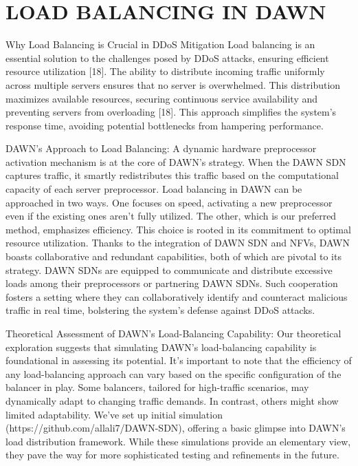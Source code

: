 \documentclass[conference]{IEEEtran}
\begin{document}
\section{LOAD BALANCING IN DAWN}

Why Load Balancing is Crucial in DDoS Mitigation
Load balancing is an essential solution to the challenges posed by DDoS attacks, ensuring efficient resource utilization [18]. The ability to distribute incoming traffic uniformly across multiple servers ensures that no server is overwhelmed. This distribution maximizes available resources, securing continuous service availability and preventing servers from overloading [18]. This approach simplifies the system's response time, avoiding potential bottlenecks from hampering performance. 

DAWN's Approach to Load Balancing: 
A dynamic hardware preprocessor activation mechanism is at the core of DAWN's strategy. When the DAWN SDN captures traffic, it smartly redistributes this traffic based on the computational capacity of each server preprocessor. Load balancing in DAWN can be approached in two ways. One focuses on speed, activating a new preprocessor even if the existing ones aren't fully utilized. The other, which is our preferred method, emphasizes efficiency. This choice is rooted in its commitment to optimal resource utilization.
Thanks to the integration of DAWN SDN and NFVs, DAWN boasts collaborative and redundant capabilities, both of which are pivotal to its strategy. DAWN SDNs are equipped to communicate and distribute excessive loads among their preprocessors or partnering DAWN SDNs. Such cooperation fosters a setting where they can collaboratively identify and counteract malicious traffic in real time, bolstering the system's defense against DDoS attacks.

Theoretical Assessment of DAWN's Load-Balancing Capability:
Our theoretical exploration suggests that simulating DAWN's load-balancing capability is foundational in assessing its potential. It's important to note that the efficiency of any load-balancing approach can vary based on the specific configuration of the balancer in play. Some balancers, tailored for high-traffic scenarios, may dynamically adapt to changing traffic demands. In contrast, others might show limited adaptability. We've set up initial simulation (https://github.com/allali7/DAWN-SDN), offering a basic glimpse into DAWN's load distribution framework. While these simulations provide an elementary view, they pave the way for more sophisticated testing and refinements in the future.
\end{document}
